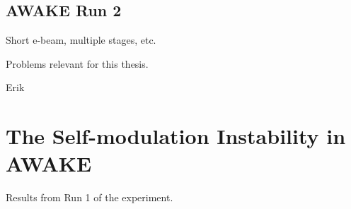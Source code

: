 \subsection{AWAKE Run 2}
\label{WFA:AWAKE:R2}

Short e-beam, multiple stages, etc.

Problems relevant for this thesis.

Erik \cite{adli:2016a}

\section{The Self-modulation Instability in AWAKE}
\label{WFA:SMI}

Results from Run 1 of the experiment.

